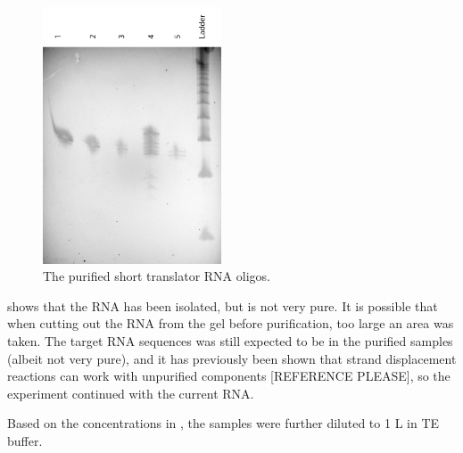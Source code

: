 \begin{figure}[H]
\centering
\includegraphics[width=150pt]{images/translator_transcription_purified.png}
\caption{The purified short translator RNA oligos.}
\label{translator_transcription_purified}
\end{figure}

 shows that the RNA has been isolated, but is not very pure. It is possible that when cutting out the RNA from the gel before purification, too large an area was taken. The target RNA sequences was still expected to be in the purified samples (albeit not very pure), and it has previously been shown that strand displacement reactions can work with unpurified components [REFERENCE PLEASE], so the experiment continued with the current RNA.

Based on the concentrations in , the samples were further diluted to 1 \si{\micro}L in TE buffer.
